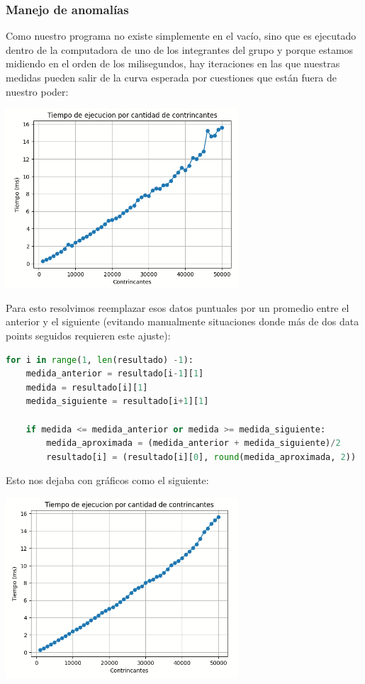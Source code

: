 \documentclass{estilo}
\begin{document}
\newpage
\subsubsection{Manejo de anomalías}
Como nuestro programa no existe simplemente en el vacío, sino que es ejecutado dentro de la computadora de uno de los integrantes del grupo y porque estamos midiendo en el orden de los milisegundos, hay iteraciones en las que nuestras medidas pueden salir de la curva esperada por cuestiones que están fuera de nuestro poder:
\begin{center}
\includegraphics[width=0.65\textwidth]{img/Anomalies.png}
\end{center}
Para esto resolvimos reemplazar esos datos puntuales por un promedio entre el anterior y el siguiente (evitando manualmente situaciones donde más de dos data points seguidos requieren este ajuste):
\begin{lstlisting}[language=Python]
for i in range(1, len(resultado) -1):
    medida_anterior = resultado[i-1][1]
    medida = resultado[i][1]
    medida_siguiente = resultado[i+1][1]

    if medida <= medida_anterior or medida >= medida_siguiente:
        medida_aproximada = (medida_anterior + medida_siguiente)/2
        resultado[i] = (resultado[i][0], round(medida_aproximada, 2))
\end{lstlisting}
Esto nos dejaba con gráficos como el siguiente:
\begin{center}
\includegraphics[width=0.65\textwidth]{img/Anomalies2.png}
\end{center}
\end{document}
